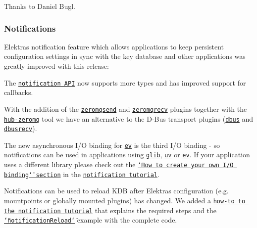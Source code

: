 Thanks to Daniel Bugl.

\subsubsection*{Notifications}

Elektra\textquotesingle{}s notification feature which allows applications to keep persistent configuration settings in sync with the key database and other applications was greatly improved with this release\+:


\begin{DoxyItemize}
\item The \href{https://doc.libelektra.org/api/current/html/group__kdbnotification.html}{\tt notification A\+PI} now supports more types and has improved support for callbacks.
\item With the addition of the \href{https://www.libelektra.org/plugins/zeromqsend}{\tt zeromqsend} and \href{https://www.libelektra.org/plugins/zeromqrecv}{\tt zeromqrecv} plugins together with the \href{https://www.libelektra.org/tools/hub-zeromq}{\tt hub-\/zeromq} tool we have an alternative to the D-\/\+Bus transport plugins (\href{https://www.libelektra.org/plugins/dbus}{\tt dbus} and \href{https://www.libelektra.org/plugins/dbusrecv}{\tt dbusrecv}).
\item The new asynchronous I/O binding for \href{https://www.libelektra.org/bindings/io_ev}{\tt ev} is the third I/O binding -\/ so notifications can be used in applications using \href{https://www.libelektra.org/bindings/io_glib}{\tt glib}, \href{https://www.libelektra.org/bindings/io_uv}{\tt uv} or \href{https://www.libelektra.org/bindings/io_ev}{\tt ev}. If your application uses a different library please check out the \href{https://www.libelektra.org/tutorials/notifications#how-to-create-your-own-i-o-binding}{\tt \char`\"{}\+How to create your own I/\+O binding\char`\"{} section} in the \href{https://www.libelektra.org/tutorials/notifications}{\tt notification tutorial}.
\item Notifications can be used to reload K\+DB after Elektra\textquotesingle{}s configuration (e.\+g. mountpoints or globally mounted plugins) has changed. We added a \href{https://www.libelektra.org/tutorials/notifications#howto-reload-kdb-when-elektras-configuration-has-changed}{\tt how-\/to to the notification tutorial} that explains the required steps and the \href{https://www.libelektra.org/examples/notificationreload}{\tt \char`\"{}notification\+Reload\char`\"{}} example with the complete code.
\end{DoxyItemize}

